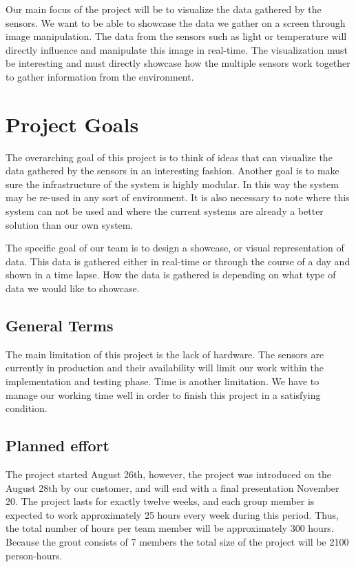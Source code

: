 \documentclass[../document.tex]{subfiles}
\begin{document}
Our main focus of the project will be to visualize the data gathered by the sensors. We want to be able to showcase the data we gather on a screen through image manipulation. The data from the sensors such as light or temperature will directly influence and manipulate this image in real-time. The visualization must be interesting and must directly showcase how the multiple sensors work together to gather information from the environment.

\section{Project Goals}
The overarching goal of this project is to think of ideas that can visualize the data gathered by the sensors in an interesting fashion. Another goal is to make sure the infrastructure of the system is highly modular. In this way the system may be re-used in any sort of environment. It is also necessary to note where this system can not be used and where the current systems are already a better solution than our own system.

The specific goal of our team is to design a showcase, or visual representation of data. This data is gathered either in real-time or through the course of a day and shown in a time lapse. How the data is gathered is depending on what type of data we would like to showcase. 

\subsection{General Terms}
The main limitation of this project is the lack of hardware. The sensors are currently in production and their availability will limit our work within the implementation and testing phase. Time is another limitation. We have to manage our working time well in order to finish this project in a satisfying condition.

\subsection{Planned effort}
The project started August 26th, however, the project was introduced on the August 28th by our customer, and will end with a final presentation November 20. The project lasts for exactly twelve weeks, and each group member is expected to work approximately 25 hours every week during this period. Thus, the total number of hours per team member will be approximately 300 hours. Because the grout consists of 7 members the total size of the project will be 2100 person-hours. 
\end{document}
